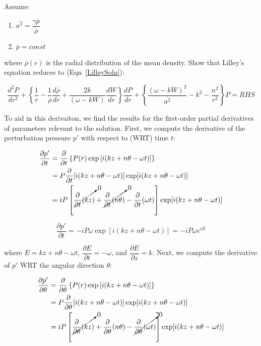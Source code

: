 \documentclass[]{aiaa-tc}%
\begin{document}
\noindent Assume:
\begin{enumerate}
  \item $\overline{a^2} = \dfrac{\gamma \overline{p}}{\overline{\rho}}$
  \item $\overline{p} = const$
\end{enumerate}

\noindent where $\overline{\rho}(r)$ is the radial distribution of the mean density.  Show that Lilley's equation reduces to (Eqn~\ref{LilleySoln}):

\begin{equation} \label{LilleySoln}
\dfrac{d^2 P}{dr^2}
+ \left\{ \dfrac{1}{r}
  - \dfrac{1}{\overline{\rho}} \dfrac{d\overline{\rho}}{dr}
  + \dfrac{2k}{(\omega - kW)} \dfrac{dW}{dr}
\right\} \dfrac{dP}{dr}
+ \left\{ \dfrac{(\omega - kW)^2}{\overline{a^2}} - k^2 - \dfrac{n^2}{r^2}
\right\} P = RHS
\end{equation}

To aid in this derivaiton, we find the results for the first-order partial derivatives of parameters relevant to the solution.  First, we compute the derivative of the perturbation pressure $p'$ with respect to (WRT) time $t$:

\newcommand\expterm{i(kz + n\theta -\omega t)}%

\begin{align*}
\dfrac{\partial p'}{\partial t} &= \dfrac{\partial}{\partial t}
  \left\{ P(r) \exp\left[ \expterm \right]\right\} \\
&= P \dfrac{\partial}{\partial t} [\expterm] \exp[\expterm] \\
&= iP \left[\cancelto{0}{\dfrac{\partial}{\partial t}(kz)      }
          + \cancelto{0}{\dfrac{\partial}{\partial t}(n\theta)}
                       - \dfrac{\partial}{\partial t}(\omega t)
    \right] \exp[\expterm] \\
\end{align*}

\begin{equation} \label{dpdt}
\boxed{\dfrac{\partial p'}{\partial t}
  = -iP\omega \exp[\expterm] = -iP\omega e^{iE} }
\end{equation}

\noindent where $E=kz + n\theta -\omega t$, $\dfrac{\partial E}{\partial t} = -\omega$, and $\dfrac{\partial E}{\partial z} = k$.  Next, we compute the derivative of $p'$ WRT the angular direction $\theta$:

\begin{align*}
\dfrac{\partial p'}{\partial \theta} &= \dfrac{\partial}{\partial \theta}
  \left\{ P(r) \exp\left[ \expterm \right]\right\} \\
&= P \dfrac{\partial}{\partial \theta} [\expterm] \exp[\expterm] \\
&= iP \left[\cancelto{0}{\dfrac{\partial}{\partial \theta}(kz)      }
                      + \dfrac{\partial}{\partial \theta}(n\theta)
          - \cancelto{0}{\dfrac{\partial}{\partial \theta}(\omega t)}
    \right] \exp[\expterm] \\
\end{align*}
\end{document}
